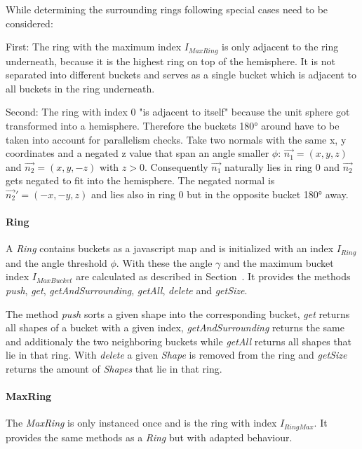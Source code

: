 \documentclass[../ClassicThesis.tex]{subfiles}
\begin{document}
While determining the surrounding rings following special cases need to be considered:

First: The ring with the maximum index $I_{MaxRing}$ is only adjacent to the ring underneath, because it is the highest ring on top of the hemisphere. It is not separated into different buckets and serves as a single bucket which is adjacent to all buckets in the ring underneath.

Second: The ring with index 0 "is adjacent to itself" because the unit sphere got transformed into a hemisphere. Therefore the buckets 180° around have to be taken into account for parallelism checks. Take two normals with the same x, y coordinates and a negated z value that span an angle smaller $ \phi $: $\vec{n_{1}} = (x, y, z)$ and $\vec{n_{2}} = (x, y, -z)$ with $z > 0$. Consequently $\vec{n_{1}}$ naturally lies in ring 0 and $\vec{n_{2}}$ gets negated to fit into the hemisphere. The negated normal is $\vec{n_{2}}' = (-x, -y, z) $ and lies also in ring 0 but in the opposite bucket 180° away.


\paragraph{Ring}

A \emph{Ring} contains buckets as a javascript map and is initialized with an index $ I_{Ring} $ and the angle threshold $ \phi$. With these the angle $ \gamma $ and the maximum bucket index $ I_{MaxBucket} $ are calculated as described in Section~. It provides the methods \emph{push}, \emph{get}, \emph{getAndSurrounding}, \emph{getAll}, \emph{delete} and \emph{getSize}.

The method \emph{push} sorts a given shape into the corresponding bucket, \emph{get} returns all shapes of a bucket with a given index, \emph{getAndSurrounding} returns the same and additionaly the two neighboring buckets while \emph{getAll} returns all shapes that lie in that ring. With \emph{delete} a given \emph{Shape} is removed from the ring and \emph{getSize} returns the amount of \emph{Shapes} that lie in that ring.


\paragraph{MaxRing} The \emph{MaxRing} is only instanced once and is the ring with index $ I_{RingMax} $. It provides the same methods as a \emph{Ring} but with adapted behaviour.
\end{document}
